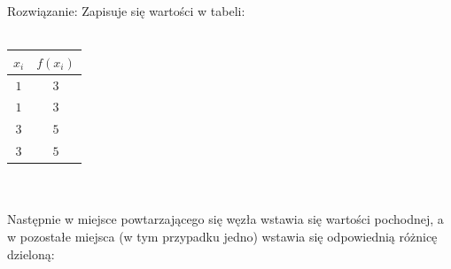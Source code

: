 \documentclass[12pt]{article}
\begin{document}
    Rozwiązanie:
    Zapisuje się wartości w tabeli:\\\\
    \begin{tabular}{|c|c|}
        \hline
        $x_i$ & $f(x_i)$ \\ \hline
        $1$ & $3$ \\ \hline
        $1$ & $3$ \\ \hline
        $3$ & $5$ \\ \hline
        $3$ & $5$ \\ \hline
    \end{tabular}\\\\
    Następnie w miejsce powtarzającego się węzła wstawia się wartości pochodnej, a w pozostałe miejsca (w tym przypadku jedno) wstawia się odpowiednią różnicę dzieloną:\\\\
\end{document}
